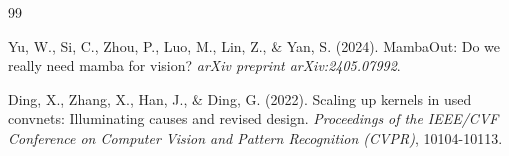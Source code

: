 \documentclass[runningheads]{llncs}
\begin{document}
\begin{thebibliography}{99}

Yu, W., Si, C., Zhou, P., Luo, M., Lin, Z., \& Yan, S. (2024). MambaOut: Do we really need mamba for vision? \textit{arXiv preprint arXiv:2405.07992}.




Ding, X., Zhang, X., Han, J., \& Ding, G. (2022). Scaling up kernels in used convnets: Illuminating causes and revised design. \textit{Proceedings of the IEEE/CVF Conference on Computer Vision and Pattern Recognition (CVPR)}, 10104-10113. 


\end{thebibliography}
\end{document}
